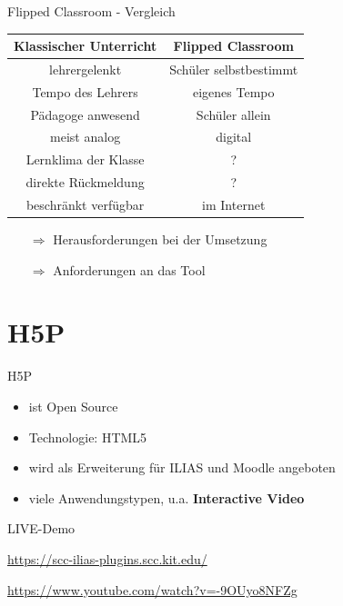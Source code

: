 \documentclass[18pt]{beamer}
\begin{document}
\begin{frame}{Flipped Classroom - Vergleich}
    \centering
    \begin{tabular}{cc}
        Klassischer Unterricht      & Flipped Classroom \\
        \hline
        \pause
        lehrergelenkt               & Schüler selbstbestimmt\\
        \pause
        Tempo des Lehrers           & eigenes Tempo \\
        \pause
        Pädagoge anwesend           & Schüler allein \\
        \pause
        meist analog                & digital \\
        \pause 
        Lernklima der Klasse        & ? \\
        \pause
        direkte Rückmeldung         & ? \\
        \pause
        beschränkt verfügbar        & im Internet \\
    \end{tabular}

    \vfill
    
    \begin{itemize}
        \item[$\Rightarrow$] Herausforderungen bei der Umsetzung
        \item[$\Rightarrow$] Anforderungen an das Tool
    \end{itemize}

    \begin{flushright}
        \cite{Schmidt}
    \end{flushright}
\end{frame}

\section{H5P}
\begin{frame}{H5P}    
    \begin{itemize}
        \item ist Open Source
        \item Technologie: HTML5
        \item wird als Erweiterung für ILIAS und Moodle angeboten
        \item viele Anwendungstypen, u.a. \textbf{Interactive Video}
    \end{itemize}
    \pause
    \vfill
    \huge LIVE-Demo

    \normalsize 
    \url{https://scc-ilias-plugins.scc.kit.edu/}

    \url{https://www.youtube.com/watch?v=-9OUyo8NFZg}
\end{frame}
\end{document}
